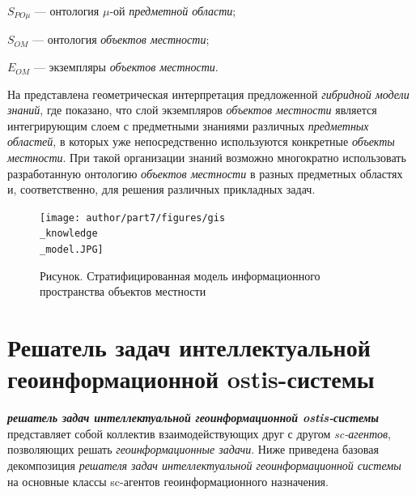 \hangindent=22mm 
$S_{PO\mu}$ --- онтология ${\mu}$-ой \textit{предметной области};

\hangindent=30mm 
$S_{OM}$ --- онтология \textit{объектов местности};

\hangindent=30mm 
$E_{OM}$ --- экземпляры \textit{объектов местности}.
\parindent=0mm

На \textit{} представлена геометрическая интерпретация предложенной \textit{гибридной модели знаний}, где показано, что слой экземпляров \textit{объектов местности} является интегрирующим слоем с предметными знаниями различных \textit{предметных областей}, в которых уже непосредственно используются конкретные \textit{объекты местности}. При такой организации знаний возможно многократно использовать  разработанную онтологию \textit{объектов местности} в разных предметных областях и, соответственно, для решения различных прикладных задач.

\begin{figure}[H]
	\caption{Рисунок. Стратифицированная модель информационного пространства объектов местности}
	\texttt{[image: author/part7/figures/gis\\\_knowledge\\\_model.JPG]}
	\label{fig:pic2_1}
\end{figure}

\section{Решатель задач интеллектуальной геоинформационной ostis-системы}
\label{chapter_gis_ps}

\textbf{\textit{решатель задач интеллектуальной геоинформационной ostis-системы}} представляет собой коллектив взаимодействующих друг с другом \textit{sc-агентов}, позволяющих решать \textit{геоинформационные задачи}. Ниже приведена базовая декомпозиция \textit{решателя задач интеллектуальной геоинформационной системы} на основные классы sc-агентов геоинформационного назначения.

